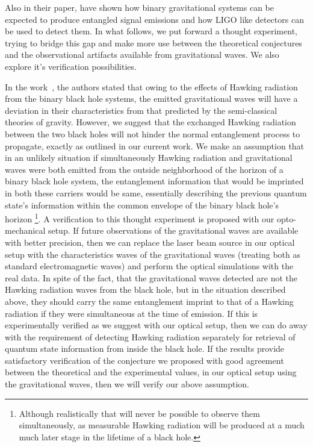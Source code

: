 \documentclass[fleqn,usenatbib]{mnras}
\begin{document}
 Also in their paper, \citep{grav} have shown how binary gravitational systems can be expected to produce entangled signal emissions and how LIGO like detectors can be used to detect them. In what follows, we put forward a thought experiment, trying to bridge this gap and make more use between the theoretical conjectures and the observational artifacts available from gravitational waves. We also explore it's verification possibilities. 

In the work~\citep{hr}, the authors stated that owing to the effects of Hawking radiation from the binary black hole systems, the emitted gravitational waves will have a deviation in their characteristics from that predicted by the semi-classical theories of gravity. However, we suggest that the exchanged Hawking radiation between the two black holes will not hinder the normal entanglement process to propagate, exactly as outlined in our current work. We make an assumption that in an unlikely situation  if simultaneously Hawking radiation and gravitational waves were both emitted from the outside neighborhood of the horizon of a binary black hole system, the entanglement information that would be imprinted in both these carriers would be same, essentially describing the previous quantum state's information within the common envelope of the binary black hole's horizon \footnote{Although realistically that will never be possible to observe them simultaneously, as measurable Hawking radiation will be produced at a much much later stage in the lifetime of a black hole.}. A verification to this thought experiment is proposed with our opto-mechanical setup. If future observations of the gravitational waves are available with better precision, then we can replace the laser beam source in our optical setup with the characteristics waves of the gravitational waves (treating both as standard electromagnetic waves) and perform the optical simulations with the real data. In spite of the fact, that the gravitational waves detected are not the Hawking radiation waves from the black hole, but in the situation described above, they should carry the same entanglement imprint to that of a Hawking radiation if they were simultaneous at the time of emission. If this is experimentally verified as we suggest with our optical setup, then we can do away with the requirement of detecting Hawking radiation separately for retrieval of quantum state information from inside the black hole. If the results provide satisfactory verification of the conjecture we proposed with good agreement between the theoretical and the experimental values, in our optical setup using the gravitational waves, then we will verify our above assumption. 
\end{document}

